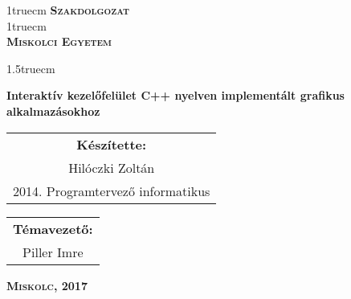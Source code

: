 \pagestyle{empty}
{\large
\begin{center}
\vglue 1truecm
\textbf{\huge\textsc{Szakdolgozat}}\\
\vglue 1truecm
\\
\textbf{\textsc{Miskolci Egyetem}}
\end{center}}

\vglue 1.5truecm

{\LARGE
\begin{center}
\textbf{Interaktív kezelőfelület C++ nyelven implementált grafikus alkalmazásokhoz}
\end{center}}

\vspace*{2.5truecm}
{\large
\begin{center}
\begin{tabular}{c}
\textbf{Készítette:}\\
Hilóczki Zoltán\\
2014. Programtervező informatikus
\end{tabular}
\end{center}
\begin{center}
\begin{tabular}{c}
\textbf{Témavezető:}\\
Piller Imre\\
\end{tabular}
\end{center}}
\vfill

{\large
\begin{center}
\textbf{\textsc{Miskolc, 2017}}
\end{center}}

\newpage
